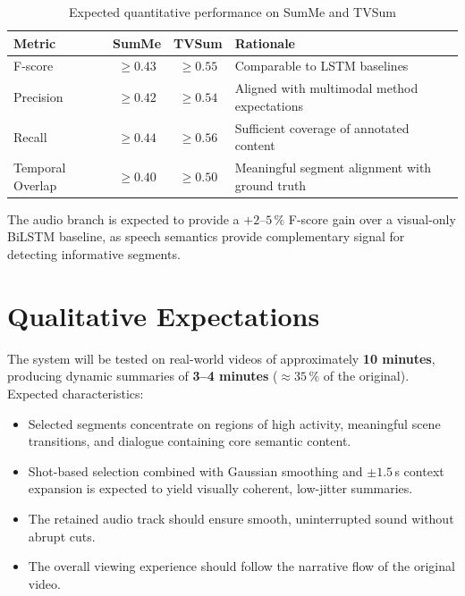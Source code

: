 \documentclass[12pt, a4paper]{report}
\begin{document}
\begin{table}[H]
\centering
\caption{Expected quantitative performance on SumMe and TVSum}
\label{tab:expected}
\begin{tabular}{lccp{5.5cm}}
  \toprule
  \textbf{Metric} & \textbf{SumMe} & \textbf{TVSum} & \textbf{Rationale} \\
  \midrule
  F-score          & $\geq 0.43$ & $\geq 0.55$ & Comparable to LSTM baselines \cite{zhang2016} \\
  Precision        & $\geq 0.42$ & $\geq 0.54$ & Aligned with multimodal method expectations \\
  Recall           & $\geq 0.44$ & $\geq 0.56$ & Sufficient coverage of annotated content \\
  Temporal Overlap & $\geq 0.40$ & $\geq 0.50$ & Meaningful segment alignment with ground truth \\
  \bottomrule
\end{tabular}
\end{table}

\noindent
The audio branch is expected to provide a $+2$--$5\,\%$ F-score gain over a
visual-only BiLSTM baseline, as speech semantics provide complementary signal
for detecting informative segments.

\section{Qualitative Expectations}

The system will be tested on real-world videos of approximately \textbf{10 minutes},
producing dynamic summaries of \textbf{3--4 minutes} ($\approx 35\,\%$ of the
original). Expected characteristics:

\begin{itemize}[leftmargin=1.5cm]
  \item Selected segments concentrate on regions of high activity, meaningful scene
        transitions, and dialogue containing core semantic content.
  \item Shot-based selection combined with Gaussian smoothing and $\pm1.5$\,s context
        expansion is expected to yield visually coherent, low-jitter summaries.
  \item The retained audio track should ensure smooth, uninterrupted sound without
        abrupt cuts.
  \item The overall viewing experience should follow the narrative flow of the
        original video.
\end{itemize}
\end{document}
